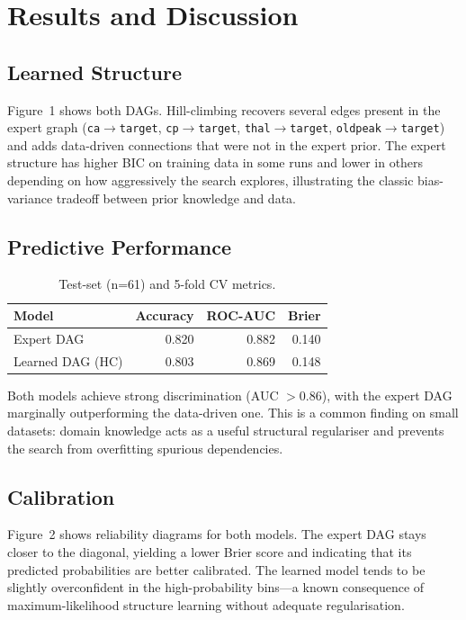 \documentclass[10pt,twocolumn]{article}
\begin{document}
\section{Results and Discussion}

\subsection{Learned Structure}
Figure~1 shows both DAGs. Hill-climbing recovers several edges present in the
expert graph (\texttt{ca}$\to$\texttt{target},
\texttt{cp}$\to$\texttt{target}, \texttt{thal}$\to$\texttt{target},
\texttt{oldpeak}$\to$\texttt{target}) and adds data-driven connections that
were not in the expert prior. The expert structure has higher BIC on
training data in some runs and lower in others depending on how aggressively
the search explores, illustrating the classic bias-variance tradeoff between
prior knowledge and data.

\subsection{Predictive Performance}

\begin{table}[h]
\centering\small
\caption{Test-set (n=61) and 5-fold CV metrics.}
\begin{tabular}{lrrr}
\toprule
Model & Accuracy & ROC-AUC & Brier \\
\midrule
Expert DAG        & 0.820 & 0.882 & 0.140 \\
Learned DAG (HC)  & 0.803 & 0.869 & 0.148 \\
\bottomrule
\end{tabular}
\end{table}

\noindent Both models achieve strong discrimination (AUC $> 0.86$), with
the expert DAG marginally outperforming the data-driven one. This is a
common finding on small datasets: domain knowledge acts as a useful
structural regulariser and prevents the search from overfitting spurious
dependencies.

\subsection{Calibration}
Figure~2 shows reliability diagrams for both models. The expert DAG stays
closer to the diagonal, yielding a lower Brier score and indicating that
its predicted probabilities are better calibrated. The learned model
tends to be slightly overconfident in the high-probability bins---a known
consequence of maximum-likelihood structure learning without adequate
regularisation.
\end{document}
